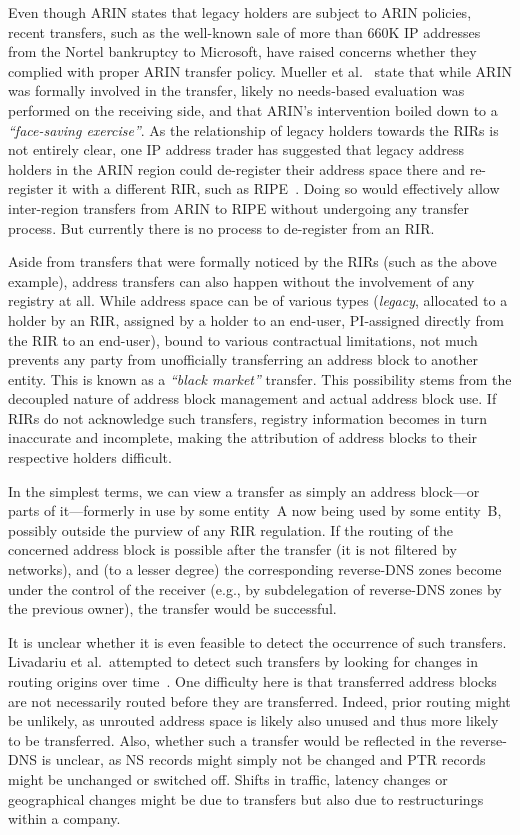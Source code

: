 \documentclass[letter]{sigcomm-alternate}
\begin{document}
Even though ARIN states that legacy holders are subject to ARIN policies,
recent transfers, such as the well-known sale of more than 660K IP addresses
from the Nortel bankruptcy to Microsoft, have raised concerns whether they
complied with proper ARIN transfer policy.  Mueller et
al.~\cite{mueller2013dimensioning}
state that while ARIN was formally involved in
the transfer, likely no needs-based evaluation was performed on the receiving
side, and that ARIN's intervention boiled down to a \textit{``face-saving
exercise''}.  As the relationship of legacy holders
towards the RIRs is not entirely clear, one IP address trader has suggested
that legacy address holders in the ARIN region could de-register their address
space there and re-register it with a different RIR, such as
RIPE~\cite{donotsignrsa}. Doing so would effectively allow inter-region
transfers from ARIN to RIPE without undergoing any transfer process.
But currently there is no process to de-register from an RIR.

Aside from transfers that were formally noticed by the RIRs (such as the 
above example), address transfers can also happen without the
involvement of any registry at all. While address space can be of various types 
(\textit{legacy}, allocated to a holder by an RIR, assigned by a holder to an 
end-user, PI-assigned directly from the RIR to an end-user), bound to various 
contractual limitations, not much prevents any party from unofficially 
transferring an address block to another entity. This is known as a 
\textit{``black market''} transfer.  This possibility stems from the decoupled 
nature of address block management and actual address block use. If RIRs do not 
acknowledge such transfers, registry information becomes in turn inaccurate and 
incomplete, making the attribution of address blocks to their respective 
holders difficult.

In the simplest terms, we can view a transfer as simply an address block---or 
parts of it---formerly in use by some entity~A now being used by some 
entity~B, possibly outside the purview of any RIR regulation.  If the 
routing of the concerned address block is possible after
the transfer (it is not filtered by networks), and (to a lesser degree)
the corresponding reverse-DNS zones become under the control of the receiver
(e.g., by subdelegation of  reverse-DNS zones by the previous owner), the 
transfer would be successful.

It is unclear whether it is even feasible to detect the occurrence
of such transfers. Livadariu et al.\ attempted to detect such transfers by
looking for changes in routing origins over time~\cite{livadariu2013first}.
One difficulty here is that transferred address blocks are not necessarily
routed before they are transferred. Indeed, prior routing might be unlikely, as
unrouted address space is likely also unused and thus more likely to be
transferred. Also, whether such a transfer would be reflected in the
reverse-DNS is unclear, as NS records might simply not be changed and PTR
records might be unchanged or switched off.  Shifts in traffic, latency changes
or geographical changes might be due to transfers but also due to
restructurings within a company.
 
\end{document}
